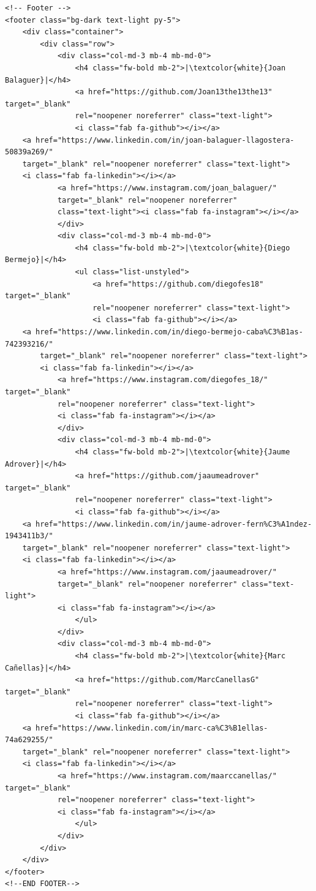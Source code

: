 \documentclass{article}
\begin{document}
\begin{verbatim}
<!-- Footer -->
<footer class="bg-dark text-light py-5">
    <div class="container">
        <div class="row">
            <div class="col-md-3 mb-4 mb-md-0">
                <h4 class="fw-bold mb-2">|\textcolor{white}{Joan Balaguer}|</h4>
                <a href="https://github.com/Joan13the13the13" target="_blank" 
                rel="noopener noreferrer" class="text-light">
                <i class="fab fa-github"></i></a>
    <a href="https://www.linkedin.com/in/joan-balaguer-llagostera-50839a269/" 
    target="_blank" rel="noopener noreferrer" class="text-light">
    <i class="fab fa-linkedin"></i></a>
            <a href="https://www.instagram.com/joan_balaguer/" 
            target="_blank" rel="noopener noreferrer"
            class="text-light"><i class="fab fa-instagram"></i></a>
            </div>
            <div class="col-md-3 mb-4 mb-md-0">
                <h4 class="fw-bold mb-2">|\textcolor{white}{Diego Bermejo}|</h4>
                <ul class="list-unstyled">
                    <a href="https://github.com/diegofes18" target="_blank" 
                    rel="noopener noreferrer" class="text-light">
                    <i class="fab fa-github"></i></a>
    <a href="https://www.linkedin.com/in/diego-bermejo-caba%C3%B1as-742393216/"
        target="_blank" rel="noopener noreferrer" class="text-light">
        <i class="fab fa-linkedin"></i></a>
            <a href="https://www.instagram.com/diegofes_18/" target="_blank"
            rel="noopener noreferrer" class="text-light">
            <i class="fab fa-instagram"></i></a>
            </div>
            <div class="col-md-3 mb-4 mb-md-0">
                <h4 class="fw-bold mb-2">|\textcolor{white}{Jaume Adrover}|</h4>
                <a href="https://github.com/jaaumeadrover" target="_blank" 
                rel="noopener noreferrer" class="text-light">
                <i class="fab fa-github"></i></a>
    <a href="https://www.linkedin.com/in/jaume-adrover-fern%C3%A1ndez-1943411b3/" 
    target="_blank" rel="noopener noreferrer" class="text-light">
    <i class="fab fa-linkedin"></i></a>
            <a href="https://www.instagram.com/jaaumeadrover/" 
            target="_blank" rel="noopener noreferrer" class="text-light">
            <i class="fab fa-instagram"></i></a>
                </ul>
            </div>
            <div class="col-md-3 mb-4 mb-md-0">
                <h4 class="fw-bold mb-2">|\textcolor{white}{Marc Cañellas}|</h4>
                <a href="https://github.com/MarcCanellasG" target="_blank" 
                rel="noopener noreferrer" class="text-light">
                <i class="fab fa-github"></i></a>
    <a href="https://www.linkedin.com/in/marc-ca%C3%B1ellas-74a629255/"
    target="_blank" rel="noopener noreferrer" class="text-light">
    <i class="fab fa-linkedin"></i></a>
            <a href="https://www.instagram.com/maarccanellas/" target="_blank"
            rel="noopener noreferrer" class="text-light">
            <i class="fab fa-instagram"></i></a>
                </ul>
            </div>
        </div>
    </div>
</footer>
<!--END FOOTER-->
\end{verbatim}
\end{document}
